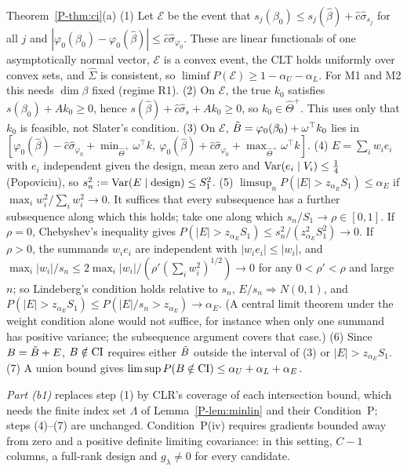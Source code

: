 \begin{proofof}{Theorem~\ref{P-thm:ci}(a)}
(1) Let $\mathcal E$ be the event that $s_j(\beta_0)\le s_j(\hat\beta)+\hat
c\hat\sigma_{s_j}$ for all $j$ and $|\varphi_0(\beta_0)-\varphi_0(\hat\beta)|\le\hat
c\hat\sigma_{\varphi_0}$. These are linear functionals of one asymptotically normal
vector, $\mathcal E$ is a convex event, the CLT holds uniformly over convex sets, and
$\hat\Sigma$ is consistent, so $\liminf P(\mathcal E)\ge1-\alpha_U-\alpha_L$. For M1 and
M2 this needs $\dim\beta$ fixed (regime R1).
(2) On $\mathcal E$, the true $k_0$ satisfies $s(\beta_0)+Ak_0\ge0$, hence
$s(\hat\beta)+\hat c\hat\sigma_s+Ak_0\ge0$, so $k_0\in\hat\Theta^+$. This uses only that
$k_0$ is feasible, not Slater's condition.
(3) On $\mathcal E$, $\tilde B=\varphi_0(\beta_0)+\omega^\top k_0$ lies in
$[\varphi_0(\hat\beta)-\hat c\hat\sigma_{\varphi_0}+\min_{\hat\Theta^+}\omega^\top k,\
\varphi_0(\hat\beta)+\hat c\hat\sigma_{\varphi_0}+\max_{\hat\Theta^+}\omega^\top k]$.
(4) $E=\sum_iw_ie_i$ with $e_i$ independent given the design, mean zero and
$\operatorname{Var}(e_i\mid V_i)\le\tfrac14$ (Popoviciu), so $s_n^2:=\operatorname{Var}(E\mid\text{design})\le S_1^2$.
(5) $\limsup_nP(|E|>z_{\alpha_E}S_1)\le\alpha_E$ if $\max_iw_i^2/\sum_iw_i^2\to0$. It
suffices that every subsequence has a further subsequence along which this holds; take
one along which $s_n/S_1\to\rho\in[0,1]$. If $\rho=0$, Chebyshev's inequality gives
$P(|E|>z_{\alpha_E}S_1)\le s_n^2/(z_{\alpha_E}^2S_1^2)\to0$. If $\rho>0$, the summands
$w_ie_i$ are independent with $|w_ie_i|\le|w_i|$, and
$\max_i|w_i|/s_n\le2\max_i|w_i|/(\rho'(\sum_iw_i^2)^{1/2})\to0$ for any $0<\rho'<\rho$ and
large $n$; so Lindeberg's condition holds relative to $s_n$, $E/s_n\Rightarrow N(0,1)$,
and $P(|E|>z_{\alpha_E}S_1)\le P(|E|/s_n>z_{\alpha_E})\to\alpha_E$. (A central limit
theorem under the weight condition alone would not suffice, for instance when only one
summand has positive variance; the subsequence argument covers that case.)
(6) Since $B=\tilde B+E$, $B\notin\mathrm{CI}$ requires either $\tilde B$ outside the interval of (3) or
$|E|>z_{\alpha_E}S_1$. (7) A union bound gives
$\limsup P(B\notin\mathrm{CI})\le\alpha_U+\alpha_L+\alpha_E$.
\end{proofof}

\emph{Part (b1)} replaces step (1) by CLR's coverage of each intersection bound, which
needs the finite index set $\Lambda$ of Lemma~\ref{P-lem:minlin} and their Condition~P;
steps (4)--(7) are unchanged. Condition~P(iv) requires gradients bounded away from zero
and a positive definite limiting covariance: in this setting, $C-1$ columns, a full-rank
design and $g_\lambda\ne0$ for every candidate.

